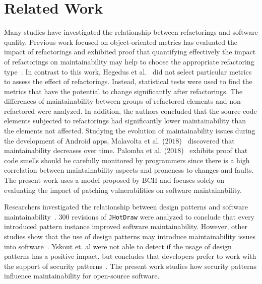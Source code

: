 \documentclass[sigconf,review]{acmart}
\begin{document}
\section{Related Work}\label{sec:rw}

Many studies have investigated the relationship between refactorings and
software quality. Previous work focused on object-oriented metrics has evaluated the
impact of refactorings and exhibited proof that quantifying effectively the
impact of refactorings on maintainability may help to choose the appropriate
refactoring type~\cite{1167822}. In contrast to this work, Hegedus et
al.~\cite{HEGEDUS2018313} did not select particular metrics to assess the effect
of refactorings. Instead, statistical tests were used to find the metrics that
have the potential to change significantly after refactorings. The differences
of maintainability between groups of refactored elements and non-refactored were
analyzed. In addition, the authors concluded that the source code elements
subjected to refactorings had significantly lower maintainability than the
elements not affected. Studying the evolution of maintainability issues during
the development of Android apps, Malavolta et al. ($2018$)~\cite{8530041}
discovered that maintainability decreases over time. Palomba et al.
($2018$)~\cite{Palomba:2018:DIM:3231288.3231337} exhibits proof that code smells
should be carefully monitored by programmers since there is a high correlation
between maintainability aspects and proneness to changes and faults. The present
work uses a model proposed by BCH and focuses solely on evaluating the impact of
patching vulnerabilities on software maintainability.

Researchers investigated the relationship between design patterns and software
maintainability~\cite{10.1007/978-3-642-35267-6-18}. $300$ revisions of
\texttt{JHotDraw} were analyzed to conclude that every introduced pattern
instance improved software maintainability. However, other studies show that the
use of design patterns may introduce maintainability issues into
software~\cite{4493325}. Yskout et. al were not able to detect if the usage of design patterns has a positive impact, but concludes that developers prefer to work with the support of security patterns~\cite{8077802}. The present work studies how security patterns influence maintainability for open-source software.
\end{document}
